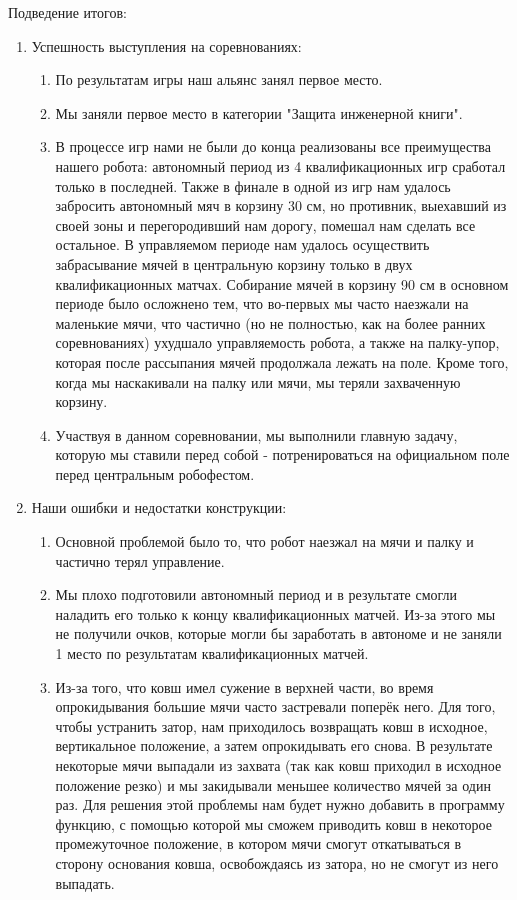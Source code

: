 Подведение итогов:
\begin{enumerate}
  \item Успешность выступления на соревнованиях:
  \begin{enumerate}
	\item По результатам игры наш альянс занял первое место.
	
	\item Мы заняли первое место в категории "Защита инженерной книги".
	
	\item В процессе игр нами не были до конца реализованы все преимущества нашего робота: автономный период из 4 квалификационных игр сработал только в последней. Также в финале в одной из игр нам удалось забросить автономный мяч в корзину 30 см, но противник, выехавший из своей зоны и перегородивший нам дорогу, помешал нам сделать все остальное. В управляемом периоде нам удалось осуществить забрасывание мячей в центральную корзину только в двух квалификационных матчах. Собирание мячей в корзину 90 см в основном периоде было осложнено тем, что во-первых мы часто наезжали на маленькие мячи, что частично (но не полностью, как на более ранних соревнованиях) ухудшало управляемость робота, а также на палку-упор, которая после рассыпания мячей продолжала лежать на поле. Кроме того, когда мы наскакивали на палку или мячи, мы теряли захваченную корзину.
	
	\item Участвуя в данном соревновании, мы выполнили главную задачу, которую мы ставили перед собой - потренироваться на официальном поле перед центральным робофестом.
	
  \end{enumerate}
  
  \item Наши ошибки и недостатки конструкции:
  \begin{enumerate}
  	\item Основной проблемой было то, что робот наезжал на мячи и палку и частично терял управление.
  	
  	\item Мы плохо подготовили автономный период и в результате смогли наладить его только к концу квалификационных матчей. Из-за этого мы не получили очков, которые могли бы заработать в автономе и не заняли 1 место по результатам квалификационных матчей.
  	
  	\item Из-за того, что ковш имел сужение в верхней части, во время опрокидывания большие мячи часто застревали поперёк него. Для того, чтобы устранить затор, нам приходилось возвращать ковш в исходное, вертикальное положение, а затем опрокидывать его снова. В результате некоторые мячи выпадали из захвата (так как ковш приходил в исходное положение резко) и мы закидывали меньшее количество мячей за один раз. Для решения этой проблемы нам будет нужно добавить в программу функцию, с помощью которой мы сможем приводить ковш в некоторое промежуточное положение, в котором мячи смогут откатываться в сторону основания ковша, освобождаясь из затора, но не смогут из него выпадать.
  	

\end{enumerate}
\end{enumerate}
